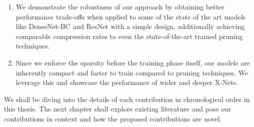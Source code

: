 \begin{enumerate}
\begin{enumerate}
\item We demonstrate the robustness of our approach by obtaining better performance trade-offs when applied to some of the state of the art models like DenseNet-BC and ResNet with a simple design, additionally achieving comparable compression rates to even the state-of-the-art trained pruning techniques.
\item Since we enforce the sparsity before the training phase itself, our models are inherently compact and faster to train compared to pruning techniques. We leverage this and showcase the performance of wider and deeper X-Nets. 
\end{enumerate}
\end{enumerate}

\noindent We shall be diving into the details of each contribution in chronological order in this thesis. The next chapter shall explore existing literature and pose our contributions in context and how the proposed contributions are novel.
